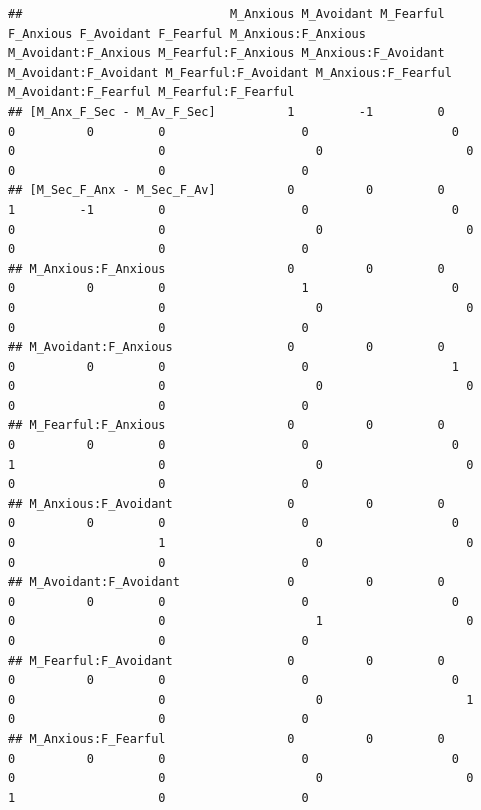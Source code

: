 \documentclass[
]{book}
\begin{document}
\begin{verbatim}
##                             M_Anxious M_Avoidant M_Fearful F_Anxious F_Avoidant F_Fearful M_Anxious:F_Anxious M_Avoidant:F_Anxious M_Fearful:F_Anxious M_Anxious:F_Avoidant M_Avoidant:F_Avoidant M_Fearful:F_Avoidant M_Anxious:F_Fearful M_Avoidant:F_Fearful M_Fearful:F_Fearful
## [M_Anx_F_Sec - M_Av_F_Sec]          1         -1         0         0          0         0                   0                    0                   0                    0                     0                    0                   0                    0                   0
## [M_Sec_F_Anx - M_Sec_F_Av]          0          0         0         1         -1         0                   0                    0                   0                    0                     0                    0                   0                    0                   0
## M_Anxious:F_Anxious                 0          0         0         0          0         0                   1                    0                   0                    0                     0                    0                   0                    0                   0
## M_Avoidant:F_Anxious                0          0         0         0          0         0                   0                    1                   0                    0                     0                    0                   0                    0                   0
## M_Fearful:F_Anxious                 0          0         0         0          0         0                   0                    0                   1                    0                     0                    0                   0                    0                   0
## M_Anxious:F_Avoidant                0          0         0         0          0         0                   0                    0                   0                    1                     0                    0                   0                    0                   0
## M_Avoidant:F_Avoidant               0          0         0         0          0         0                   0                    0                   0                    0                     1                    0                   0                    0                   0
## M_Fearful:F_Avoidant                0          0         0         0          0         0                   0                    0                   0                    0                     0                    1                   0                    0                   0
## M_Anxious:F_Fearful                 0          0         0         0          0         0                   0                    0                   0                    0                     0                    0                   1                    0                   0

\end{verbatim}
\end{document}
